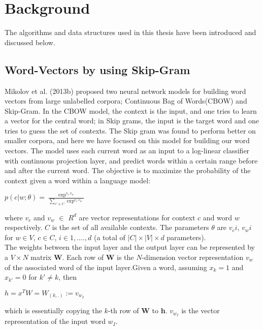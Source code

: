 \chapter{Background}
	The algorithms and data structures used in this thesis have been introduced and discussed below.
	\section{Word-Vectors by using Skip-Gram}
	\label{sec:skipgram}
Mikolov et al. (2013b) proposed two neural network models for building word vectors from large unlabelled corpora; Continuous Bag of Words(CBOW) and Skip-Gram.  In the CBOW model, the context is the input, and one tries to learn a vector for the central word; in Skip grams, the input is the target word and one tries to guess the set of contexts.  The Skip gram was found to perform better on smaller corpora, and here we have focused on this model for building our word vectors. The model uses each current word as an input to a log-linear classifier with continuous projection layer, and predict words within a certain range before and after the current word. The objective is to maximize the probability of the context given a word within a language model:

\begin{center} $p(c|w;\theta)=\frac{\exp^{v_c.v_w}}{\sum_{c' \in C}\exp^{v_c.v_w}}$ \end{center}
where $v_c$ and $v_w$ $\in$ $R^d$ are vector representations for context $c$ and word $w$ respectively. $C$ is the set of all available contexts. The parameters $\theta$ are $v_ci$, $v_wi$ for $w \in V$, $c \in C$, $i \in 1,....,d$ (a total of $|C| \times |V| \times d$ parameters).\\

The weights between the input layer and the output layer can be represented by a $V \times N$ matrix \textbf{W}. Each row of \textbf{W} is the $N$-dimension vector representation $v_w$ of the associated word of the input layer.Given a word, assuming $x_k=1$ and $x_{k'}=0$ for $k' \neq k$, then
\begin{center}
$h=x^TW=W_{(k,.)}:=v_{w_I}$
\end{center}
which is essentially copying the $k$-th row of \textbf{W} to \textbf{h}. $v_{w_I}$ is the vector representation of the input word $w_I$.


